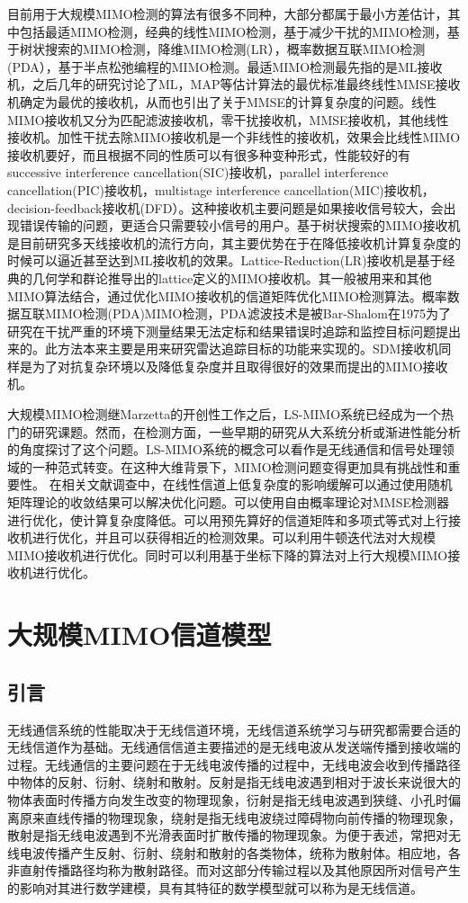 \documentclass[bachelor,nocolorlinks, printoneside]{seuthesis} %
\begin{document}
\begin{Main}
目前用于大规模MIMO检测的算法有很多不同种，大部分都属于最小方差估计，其中包括最适MIMO检测，经典的线性MIMO检测，基于减少干扰的MIMO检测，基于树状搜索的MIMO检测，降维MIMO检测(LR），概率数据互联MIMO检测(PDA），基于半点松弛编程的MIMO检测。最适MIMO检测最先指的是ML接收机，之后几年的研究讨论了ML，MAP等估计算法的最优标准最终线性MMSE接收机确定为最优的接收机，从而也引出了关于MMSE的计算复杂度的问题。线性MIMO接收机又分为匹配滤波接收机，零干扰接收机，MMSE接收机，其他线性接收机。加性干扰去除MIMO接收机是一个非线性的接收机，效果会比线性MIMO接收机要好，而且根据不同的性质可以有很多种变种形式，性能较好的有successive interference cancellation(SIC)接收机，parallel interference cancellation(PIC)接收机，multistage interference cancellation(MIC)接收机，decision-feedback接收机(DFD）。这种接收机主要问题是如果接收信号较大，会出现错误传输的问题，更适合只需要较小信号的用户。基于树状搜索的MIMO接收机是目前研究多天线接收机的流行方向，其主要优势在于在降低接收机计算复杂度的时候可以逼近甚至达到ML接收机的效果。Lattice-Reduction(LR)接收机是基于经典的几何学和群论推导出的lattice定义的MIMO接收机。其一般被用来和其他MIMO算法结合，通过优化MIMO接收机的信道矩阵优化MIMO检测算法。概率数据互联MIMO检测(PDA)MIMO检测，PDA滤波技术是被Bar-Shalom在1975为了研究在干扰严重的环境下测量结果无法定标和结果错误时追踪和监控目标问题提出来的。此方法本来主要是用来研究雷达追踪目标的功能来实现的。SDM接收机同样是为了对抗复杂环境以及降低复杂度并且取得很好的效果而提出的MIMO接收机。

大规模MIMO检测继Marzetta的开创性工作之后，LS-MIMO系统已经成为一个热门的研究课题。然而，在检测方面，一些早期的研究从大系统分析或渐进性能分析的角度探讨了这个问题。LS-MIMO系统的概念可以看作是无线通信和信号处理领域的一种范式转变。在这种大维背景下，MIMO检测问题变得更加具有挑战性和重要性。
在相关文献调查中，在线性信道上低复杂度的影响缓解可以通过使用随机矩阵理论的收敛结果可以解决优化问题。可以使用自由概率理论对MMSE检测器进行优化，使计算复杂度降低。可以用预先算好的信道矩阵和多项式等式对上行接收机进行优化，并且可以获得相近的检测效果。可以利用牛顿迭代法对大规模MIMO接收机进行优化。同时可以利用基于坐标下降的算法对上行大规模MIMO接收机进行优化。

\chapter{大规模MIMO信道模型}
\section{引言}
无线通信系统的性能取决于无线信道环境，无线信道系统学习与研究都需要合适的无线信道作为基础。无线通信信道主要描述的是无线电波从发送端传播到接收端的过程。无线通信的主要问题在于无线电波传播的过程中，无线电波会收到传播路径中物体的反射、衍射、绕射和散射。反射是指无线电波遇到相对于波长来说很大的物体表面时传播方向发生改变的物理现象，衍射是指无线电波遇到狭缝、小孔时偏离原来直线传播的物理现象，绕射是指无线电波绕过障碍物向前传播的物理现象，散射是指无线电波遇到不光滑表面时扩散传播的物理现象。为便于表述，常把对无线电波传播产生反射、衍射、绕射和散射的各类物体，统称为散射体。相应地，各非直射传播路径均称为散射路径。而对这部分传输过程以及其他原因所对信号产生的影响对其进行数学建模，具有其特征的数学模型就可以称为是无线信道。


\end{Main}
\end{document}
